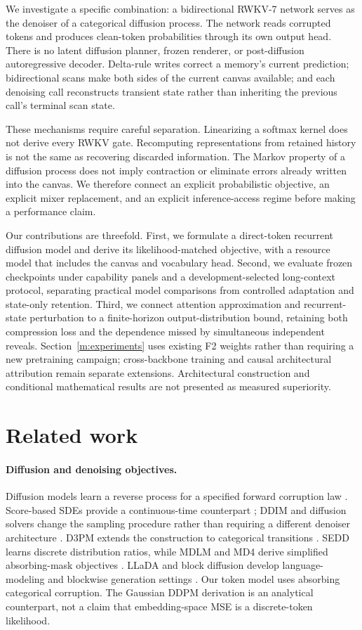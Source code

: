\documentclass{article}
\theoremstyle{remark}\newtheorem{remark}[theorem]{Remark}
\begin{document}
We investigate a specific combination: a bidirectional RWKV-7 network \citep{rwkv7} serves as the denoiser of a categorical diffusion process. The network reads corrupted tokens and produces clean-token probabilities through its own output head. There is no latent diffusion planner, frozen renderer, or post-diffusion autoregressive decoder. Delta-rule writes correct a memory's current prediction; bidirectional scans make both sides of the current canvas available; and each denoising call reconstructs transient state rather than inheriting the previous call's terminal scan state.

These mechanisms require careful separation. Linearizing a softmax kernel does not derive every RWKV gate. Recomputing representations from retained history is not the same as recovering discarded information. The Markov property of a diffusion process does not imply contraction or eliminate errors already written into the canvas. We therefore connect an explicit probabilistic objective, an explicit mixer replacement, and an explicit inference-access regime before making a performance claim.

Our contributions are threefold. First, we formulate a direct-token recurrent diffusion model and derive its likelihood-matched objective, with a resource model that includes the canvas and vocabulary head. Second, we evaluate frozen checkpoints under capability panels and a development-selected long-context protocol, separating practical model comparisons from controlled adaptation and state-only retention. Third, we connect attention approximation and recurrent-state perturbation to a finite-horizon output-distribution bound, retaining both compression loss and the dependence missed by simultaneous independent reveals. Section~\ref{m:experiments} uses existing F2 weights rather than requiring a new pretraining campaign; cross-backbone training and causal architectural attribution remain separate extensions. Architectural construction and conditional mathematical results are not presented as measured superiority.

\section{Related work}
\label{m:related}
\paragraph{Diffusion and denoising objectives.}
Diffusion models learn a reverse process for a specified forward corruption law \citep{sohl,ddpm}. Score-based SDEs provide a continuous-time counterpart \citep{scoresde}; DDIM and diffusion solvers change the sampling procedure rather than requiring a different denoiser architecture \citep{ddim,dpmsolver}. D3PM extends the construction to categorical transitions \citep{d3pm}. SEDD learns discrete distribution ratios, while MDLM and MD4 derive simplified absorbing-mask objectives \citep{sedd,mdlm,md4}. LLaDA and block diffusion develop language-modeling and blockwise generation settings \citep{llada,blockdiffusion}. Our token model uses absorbing categorical corruption. The Gaussian DDPM derivation is an analytical counterpart, not a claim that embedding-space MSE is a discrete-token likelihood.
\end{document}
